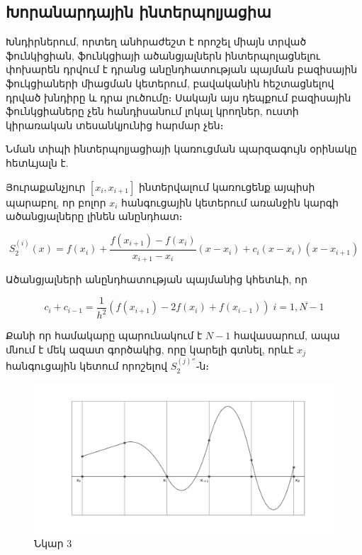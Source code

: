 \documentclass[fleqn, bachelor,subf,12pt,notitlepage]{disser}
\begin{document}
\newpage

\subsection*{Խորանարդային ինտերպոլյացիա}

Խնդիրներում, որտեղ անհրաժեշտ է որոշել միայն տրված ֆունկիցիան, ֆունկցիայի ածանցյալներն ինտերպոլացնելու փոխարեն դրվում է դրանց անընդհատության պայման բազիսային ֆուկցիաների միացման կետերում,  բավականին հեշտացնելով դրված խնդիրը և դրա լուծումը։ Սակայն այս դեպքում բազիսային ֆունկցիաները չեն հանդիսանում լոկալ կրողներ, ուստի կիրառական տեսանկյունից հարմար չեն։

Նման տիպի ինտերպոլյացիայի կառուցման պարզագույն օրինակը հետևյալն է.

\noindent Յուրաքանչյուր $\left[x_{i}, x_{i+1}\right]$ ինտերվալում կառուցենք այպիսի պարաբոլ, որ բոլոր $x_{i}$ հանգուցային կետերում առանջին կարգի ածանցյալները լինեն անընդհատ։

$$S_{2}^{(i)}(x)=f(x_{i})+\dfrac{f(x_{i+1})-f(x_{i})}{x_{i+1}-x_{i}}\left(x-x_{i}\right)+c_{i}\left(x-x_{i}\right)\left(x-x_{i+1}\right)$$

\noindent Ածանցյալների անընդհատության պայմանից կհետևի, որ

$$c_{i}+c_{i-1}=\dfrac{1}{h^{2}}\left(f(x_{i+1})-2f(x_{i})+f(x_{i-1})\right) \; i=\overline{1, N-1}$$

Քանի որ համակարը պարունակում է $N-1$ հավասարում, ապա մնում է մեկ ազատ գործակից, որը կարելի գտնել, որևէ $x_{j}$ հանգուցային կետում որոշելով $S_{2}^{(j)''}$֊ն։

\begin{figure}[h!]
\centering
\includegraphics[width=1.0\textwidth]{images/one_var_non_hermite_1}
\captionsetup{labelformat=empty}
\caption{\hfill Նկար 3}
\end{figure}
\end{document}
